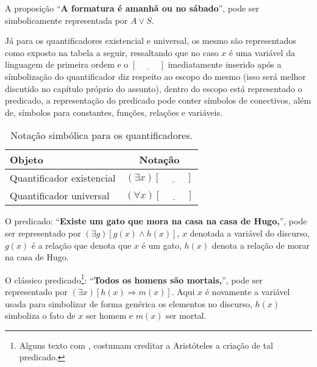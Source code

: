 \begin{exemplo}\label{exe:RepresentacaoSimbolica2}
	A proposição ``\textbf{A formatura é amanhã ou no sábado}'', pode ser simbolicamente representada por $A \lor S$.
\end{exemplo}

Já para os quantificadores existencial e universal, os mesmo são representados como exposto na tabela a seguir, ressaltando que no caso $x$ é uma variável da linguagem de primeira ordem e o $[\underline{ \ \ \ \ \ \ \ \ \ \ \ \ }]$ imediatamente inserido após a símbolização do quantificador diz respeito ao escopo do mesmo (isso será melhor discutido no capítulo próprio do assunto), dentro do escopo está representado o predicado, a representação do predicado pode conter símbolos de conectivos, além de, símbolos para constantes, funções, relações e variáveis. 

\begin{table}[h]
	\centering
	\begin{tabular}{lc}
		\hline
		\textbf{Objeto} & \textbf{Notação}\\
		\hline
		Quantificador existencial & $(\exists x)[\underline{ \ \ \ \ \ \ \ \ \ \ \ \ }]$\\
		Quantificador universal & $(\forall x)[\underline{ \ \ \ \ \ \ \ \ \ \ \ \ }]$\\
		\hline
	\end{tabular}
	\caption{Notação simbólica para os quantificadores.}
\end{table}

\begin{exemplo}\label{exe:RepresentacaoSimbolica3}
	O predicado: ``\textbf{Existe um gato que mora na casa na casa de Hugo,}'', pode ser representado por $(\exists g)[g(x) \land h(x)]$, $x$ denotada a variável do discurso, $g(x)$ é a relação que denota que $x$ é um gato, $h(x)$ denota a relação de morar na casa de Hugo.
\end{exemplo}

\begin{exemplo}\label{exe:RepresentacaoSimbolica4}
	O clássico predicado\footnote{Alguns texto com \cite{carmo2013}, costumam creditar a Aristóteles a criação de tal predicado.}: ``\textbf{Todos os homens são mortais,}'', pode ser representado por $(\exists x)[h(x) \Rightarrow m(x)]$. Aqui $x$ é novamente a variável usada para simbolizar de forma genérica os elementos no discurso, $h(x)$ simboliza o fato de $x$ ser homem e $m(x)$ ser mortal.
\end{exemplo}

